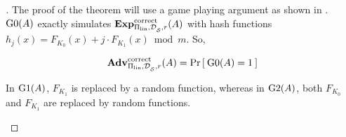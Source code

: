 \begin{proof}[]
The proof of the theorem will use a game playing argument as shown in . $\text{G0}(A)$ exactly simulates $\mathrm{\mathbf{Exp}}^{\mathrm{correct}}_{\Pi_\mathrm{lin},\mathcal{D}_{{\cal S}}^{},r}(A)$ with hash functions $h_j(x) =  F_{K_0}(x) + j\cdot F_{K_1}(x) \bmod m$. So,

\begin{equation}
\mathrm{\mathbf{Adv}}^{\mathrm{correct}}_{\Pi_{\mathrm{lin}},\mathcal{D}_{{\cal S}}^{},r}(A) = \Pr\left[\: \text{G0}(A)=1 \:\right]\label{eq:0}
\end{equation}

 In $\text{G1}(A)$, $F_{K_1}$ is replaced by a random function, whereas in $\text{G2}(A)$, both $F_{K_0}$ and $F_{K_1}$ are replaced by random functions.

\begin{figure}
\centering
{}
\end{figure}
\end{proof}
